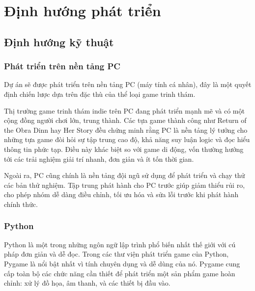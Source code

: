 \section{Định hướng phát triển}
\subsection{Định hướng kỹ thuật}

\subsubsection{Phát triển trên nền tảng PC} 
Dự án sẽ được phát triển trên nền tảng PC (máy tính cá nhân), đây là một quyết định chiến lược dựa trên đặc thù của thể loại game trinh thám. 

Thị trường game trinh thám indie trên PC đang phát triển mạnh mẽ và có một cộng đồng người chơi lớn, trung thành. Các tựa game thành công như Return of the Obra Dinn hay Her Story đều chứng minh rằng PC là nền tảng lý tưởng cho những tựa game đòi hỏi sự tập trung cao độ, khả năng suy luận logic và đọc hiểu thông tin phức tạp. Điều này khác biệt so với game di động, vốn thường hướng tới các trải nghiệm giải trí nhanh, đơn giản và ít tốn thời gian.

Ngoài ra, PC cũng chính là nền tảng đội ngũ sử dụng để phát triển và chạy thử các bản thử nghiệm. Tập trung phát hành cho PC trước giúp giảm thiểu rủi ro, cho phép nhóm  dễ dàng điều chỉnh, tối ưu hóa và sửa lỗi trước khi phát hành chính thức.

\subsubsection{Python}
Python là một trong những ngôn ngữ lập trình phổ biến nhất thế giới với cú pháp đơn giản và dễ đọc. Trong các thư viện phát triển game của Python, Pygame là nổi bật nhất vì tính chuyên dụng và dễ dùng của nó. Pygame cung cấp toàn bộ các chức năng cần thiết để phát triển một sản phẩm game hoàn chỉnh: xử lý đồ họa, âm thanh, và các thiết bị đầu vào.


